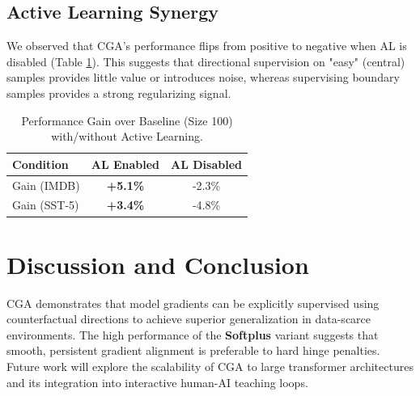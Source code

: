 \documentclass[sigconf,anonymous]{aamas}
\begin{document}
\subsection{Active Learning Synergy}
We observed that CGA's performance flips from positive to negative when AL is disabled (Table \ref{tab:al_synergy}). This suggests that directional supervision on "easy" (central) samples provides little value or introduces noise, whereas supervising boundary samples provides a strong regularizing signal.

\begin{table}[h]
\centering
\caption{Performance Gain over Baseline (Size 100) with/without Active Learning.}
\label{tab:al_synergy}
\begin{tabular}{lcc}
\toprule
\textbf{Condition} & \textbf{AL Enabled} & \textbf{AL Disabled} \\ \midrule
Gain (IMDB) & \textbf{+5.1\%} & -2.3\% \\
Gain (SST-5) & \textbf{+3.4\%} & -4.8\% \\
\bottomrule
\end{tabular}
\end{table}

\section{Discussion and Conclusion}
CGA demonstrates that model gradients can be explicitly supervised using counterfactual directions to achieve superior generalization in data-scarce environments. The high performance of the \textbf{Softplus} variant suggests that smooth, persistent gradient alignment is preferable to hard hinge penalties. Future work will explore the scalability of CGA to large transformer architectures and its integration into interactive human-AI teaching loops.

\balance


\end{document}
